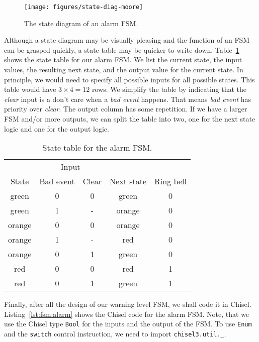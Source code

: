 \documentclass[%
    10pt,
    headinclude, footexclude,
    openright, %
    notitlepage,
    cleardoubleempty,
    headsepline,
    pointlessnumbers,
    bibtotoc, idxtotoc,
    ]{scrbook}
\newcommand{\code}[1]{{\small{\texttt{#1}}}}
\newcommand{\scale}{0.7}
\begin{document}
\begin{figure}
  \centering
  \texttt{[image: figures/state-diag-moore]}
  \caption{The state diagram of an alarm FSM.}
  \label{fig:diag-moore}
\end{figure}

Although a state diagram may be visually pleasing and the function of an FSM
can be grasped quickly, a state table may be quicker to write down.
Table~\ref{tab:state:table} shows the state table for our alarm FSM.
We list the current state, the input values, the resulting next state, and
the output value for the current state. In principle, we would need to
specify all possible inputs for all possible states. This table would have
$3 \times 4 = 12$ rows. We simplify the table by indicating that the \emph{clear}
input is a don't care when a \emph{bad event} happens. That means
\emph{bad event} has priority over \emph{clear}. The output column
has some repetition. If we have a larger FSM and/or more outputs, we
can split the table into two, one for the next state logic and one for the
output logic.

\begin{table}
\centering
\caption{State table for the alarm FSM.}
\begin{tabular}{ccccc}
\toprule
& \multicolumn{2}{c}{Input} \\
\cmidrule{2-3}
State &  Bad event & Clear & Next state & Ring bell \\
\midrule
green & 0 & 0 & green & 0 \\
green & 1 & - & orange & 0 \\
orange & 0 & 0 & orange & 0 \\
orange & 1 & - & red & 0 \\
orange & 0 & 1 & green & 0 \\
red & 0 & 0 & red & 1 \\
red & 0 & 1 & green & 1 \\
\bottomrule
\end{tabular}
\label{tab:state:table}
\end{table}

Finally, after all the design of our warning level FSM, we shall code it in Chisel.
Listing~\ref{lst:fsm:alarm} shows the Chisel code for the alarm FSM.
Note, that we use the Chisel type \code{Bool} for the inputs and the
output of the FSM.
To use \code{Enum} and the \code{switch} control instruction, we need to
import \code{chisel3.util.\_}.

\end{document}
